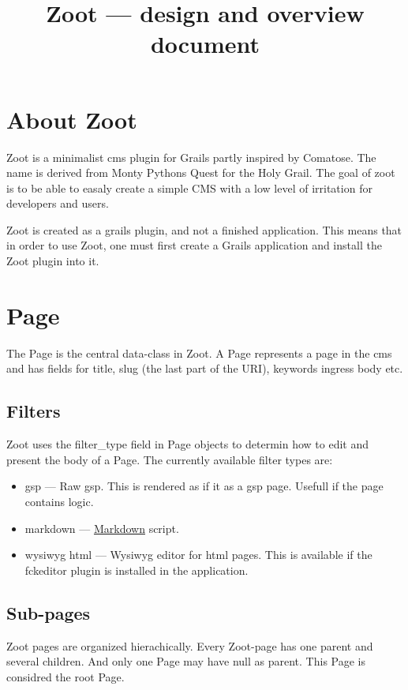 \documentclass[a4paper,10pt]{article}
\title{Zoot --- design and overview document}
\author{}
\begin{document}
\maketitle


\section{About Zoot}

Zoot is a minimalist cms plugin for Grails partly inspired by Comatose. The name is derived from Monty Pythons Quest for the Holy Grail.
The goal of zoot is to be able to easaly create a simple CMS with a low level of irritation for developers and users.

Zoot is created as a grails plugin, and not a finished application. This means that in order to use Zoot, one must first create a Grails application and install the Zoot plugin into it.

\section{Page}
The Page is the central data-class in Zoot. A Page represents a page in the cms and has fields for title, slug (the last part of the URI), keywords ingress body etc.

\subsection{Filters}

Zoot uses the filter\_type field in Page objects to determin how to edit and present the body of a Page. The currently available filter types are:

\begin{itemize}
 \item gsp --- Raw gsp. This is rendered as if it as a gsp page. Usefull if the page contains logic.
 \item markdown --- \href{http://en.wikipedia.org/wiki/Markdown}{Markdown} script.
 \item wysiwyg html --- Wysiwyg editor for html pages. This is available if the fckeditor plugin is installed in the application.
\end{itemize}


\subsection{Sub-pages}

Zoot pages are organized hierachically. Every Zoot-page has one parent and several children. And only one Page may have null as parent. This Page is considred the root Page.
\end{document}
